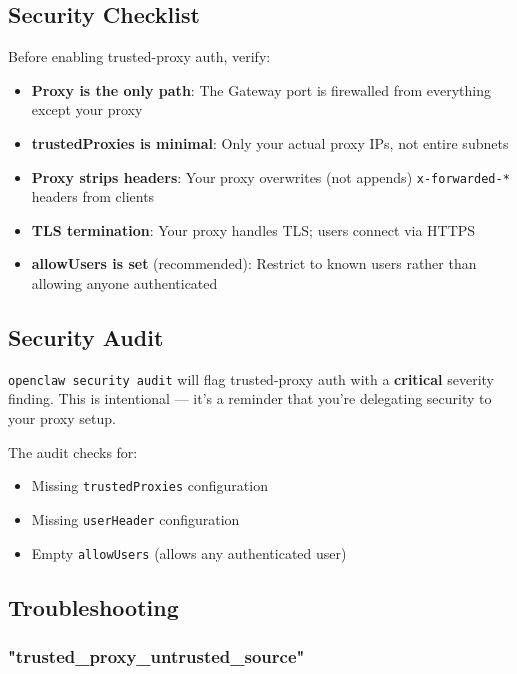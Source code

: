 \subsection{Security Checklist}


Before enabling trusted-proxy auth, verify:

\begin{itemize}
  \item [ ] \textbf{Proxy is the only path}: The Gateway port is firewalled from everything except your proxy
  \item [ ] \textbf{trustedProxies is minimal}: Only your actual proxy IPs, not entire subnets
  \item [ ] \textbf{Proxy strips headers}: Your proxy overwrites (not appends) \texttt{x-forwarded-*} headers from clients
  \item [ ] \textbf{TLS termination}: Your proxy handles TLS; users connect via HTTPS
  \item [ ] \textbf{allowUsers is set} (recommended): Restrict to known users rather than allowing anyone authenticated
\end{itemize}


\subsection{Security Audit}


\texttt{openclaw security audit} will flag trusted-proxy auth with a \textbf{critical} severity finding. This is intentional — it's a reminder that you're delegating security to your proxy setup.

The audit checks for:

\begin{itemize}
  \item Missing \texttt{trustedProxies} configuration
  \item Missing \texttt{userHeader} configuration
  \item Empty \texttt{allowUsers} (allows any authenticated user)
\end{itemize}


\subsection{Troubleshooting}


\subsubsection{"trusted\_proxy\_untrusted\_source"}


